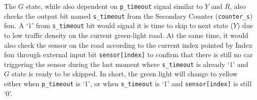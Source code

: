 The $G$ state, while also dependent on \texttt{p\_timeout} signal similar to $Y$ and $R$, also checks the output bit named \texttt{s\_timeout} from the Secondary Counter (\texttt{counter\_s}) \ac{fsm}. A `1' from \texttt{s\_timeout} bit would signal it is time to skip to next state ($Y$) due to low traffic density on the current green-light road. At the same time, it would also check the sensor on the road according to the current index pointed by Index \ac{fsm} through external input bit \texttt{sensor[index]} to confirm that there is still no car triggering the sensor during the last moment where \texttt{s\_timeout} is already `1' and $G$ state is ready to be skipped. In short, the green light will change to yellow either when \texttt{p\_timeout} is `1', or when \texttt{s\_timeout} is `1' and \texttt{sensor[index]} is still `0'.

